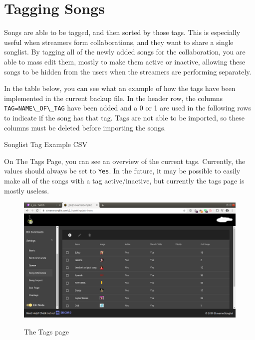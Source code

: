 
\section{Tagging Songs}
Songs are able to be tagged, and then sorted by those tags. This is especially useful when streamers form collaborations, and they want to share a single songlist. By tagging all of the newly added songs for the collaboration, you are able to mass edit them, mostly to make them active or inactive, allowing these songs to be hidden from the users when the streamers are performing separately.

In the table below, you can see what an example of how the tags have been implemented in the current backup file. In the header row, the columns \mbox{\lstinline{TAG=NAME\_OF\_TAG}} have been added and a 0 or 1 are used in the following rows to indicate if the song has that tag. Tags are not able to be imported, so these columns must be deleted before importing the songs.


\begin{table}[h!]
\caption{Songlist Tag Example CSV}
\label{tag_example.csv}
\end{table}

\clearpage
On The Tags Page, you can see an overview of the current tags. Currently, the values should always be set to \lstinline{Yes}. In the future, it may be possible to easily make all of the songs with a tag active/inactive, but currently the tags page is mostly useless.

\begin{figure}[ht!]
  \includegraphics[width=\linewidth]{src/tags/tags.png}
  \caption{The Tags page}
  \label{tags_page}
\end{figure}

